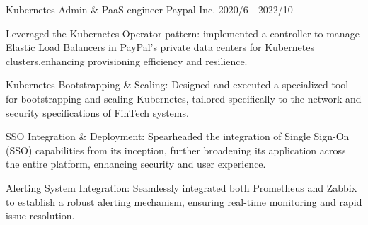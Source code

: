 \begin{cventries}
  
  \cventry
    {Kubernetes Admin \& PaaS engineer} %
    {Paypal Inc.} %
    {} %
    {2020/6 - 2022/10} %
    {
      \begin{cvitems} %
        \item {Leveraged the Kubernetes Operator pattern: implemented a controller to manage Elastic Load Balancers in PayPal's private data centers for Kubernetes clusters,enhancing provisioning efficiency and resilience. }
        \item {Kubernetes Bootstrapping \& Scaling: Designed and executed a specialized tool for bootstrapping and scaling Kubernetes, tailored specifically to the network and security specifications of FinTech systems. }
        \item {SSO Integration \& Deployment: Spearheaded the integration of Single Sign-On (SSO) capabilities from its inception, further broadening its application across the entire platform, enhancing security and user experience. }
        \item {Alerting System Integration: Seamlessly integrated both Prometheus and Zabbix to establish a robust alerting mechanism, ensuring real-time monitoring and rapid issue resolution. }
      \end{cvitems}
    }



\end{cventries}

